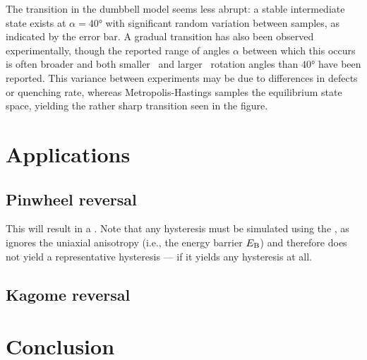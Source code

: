 
The transition in the dumbbell model seems less abrupt: a stable intermediate state exists at $\alpha=\ang{40}$ with significant random variation between samples, as indicated by the error bar. %
A gradual transition has also been observed experimentally, though the reported range of angles $\alpha$ between which this occurs is often broader and both smaller~\cite{ProbingAFM-PMtransition} and larger~\cite{AFM-FM-transition-Pinwheel} rotation angles than $\ang{40}$ have been reported.
This variance between experiments may be due to differences in defects or quenching rate, whereas Metropolis-Hastings samples the equilibrium state space, yielding the rather sharp transition seen in the figure.

\newpage
\section{Applications}
\subsection{Pinwheel reversal}\label{sec:2:Applications_reversal_Pinwheel}
This will result in a .
Note that any hysteresis must be simulated using the , as  ignores the uniaxial anisotropy (i.e., the energy barrier $E_\mathrm{B}$) and therefore does not yield a representative hysteresis --- if it yields any hysteresis at all.

\subsection{Kagome reversal}


\section{Conclusion}
